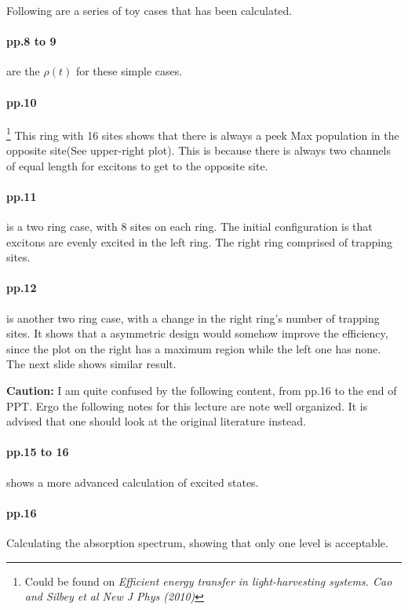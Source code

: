 \documentclass{article}
\numberwithin{equation}{subsection} %
\theoremstyle{definition}
\begin{document}
Following are a series of toy cases that has been calculated.

\paragraph{pp.8 to 9} are the $\rho(t)$ for these simple cases.

\paragraph{pp.10}
\footnote{Could be found on \textit{Efficient energy transfer in 
light-harvesting systems. Cao and Silbey et al New J Phys (2010)}}
This ring with 16 sites shows that there is always 
a peek Max population in the opposite site(See upper-right plot). This is
because there is always
two channels of equal length for excitons to get to the opposite site.

\paragraph{pp.11} is 
a two ring case, with 8 sites on each ring. The initial configuration
is that excitons are evenly excited in the left ring. 
The right ring comprised of trapping sites.

\paragraph{pp.12} is 
another two ring case, with a change in the right ring's number
of trapping sites. It shows that a asymmetric design would somehow
improve the efficiency, since the plot on the right has a maximum region
while the left one has none. The next slide shows similar result.

\textbf{Caution:} I am quite confused by the following content,
from pp.16 to the end of PPT. Ergo the following notes for this lecture
are note well organized. It is advised that one should
look at the original literature instead.

\paragraph{pp.15 to 16} shows a more advanced calculation of excited
states.

\paragraph{pp.16} Calculating the absorption spectrum, 
showing that only one level is acceptable.
\end{document}
